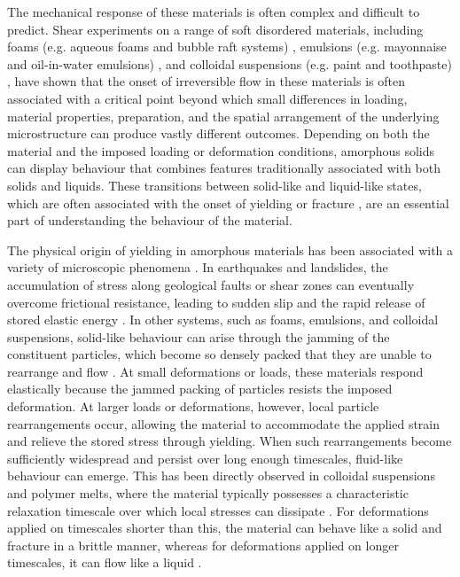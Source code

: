 The mechanical response of these materials is often complex and difficult to predict. Shear experiments on a range of soft disordered materials, including foams (e.g. aqueous foams and bubble raft systems) \cite{durian_foam_1995,Khan1988,WEAIRE2008}, emulsions (e.g. mayonnaise and oil-in-water emulsions) \cite{Mason1996,Datta2011,Derkach2009,AbuJdayil2003}, and colloidal suspensions (e.g. paint and toothpaste) \cite{Mewis2011,Koumakis2011,Petekidis2004,Cloitre2003}, have shown that the onset of irreversible flow in these materials is often associated with a critical point \cite{nicolas_deformation_2018,Divoux2024,lin_scaling_2014,Ozawa2018,Dahmen2011} beyond which small differences in loading, material properties, preparation, and the spatial arrangement of the underlying microstructure can produce vastly different outcomes. Depending on both the material and the imposed loading or deformation conditions, amorphous solids can display behaviour that combines features traditionally associated with both solids and liquids. These transitions between solid-like and liquid-like states, which are often associated with the onset of yielding or fracture \cite{nicolas_deformation_2018,Divoux2024,lin_scaling_2014,Ozawa2018,Dahmen2011}, are an essential part of understanding the behaviour of the material.

The physical origin of yielding in amorphous materials has been associated with a variety of microscopic phenomena \cite{bonn_yield_2017}. In earthquakes and landslides, the accumulation of stress along geological faults or shear zones can eventually overcome frictional resistance, leading to sudden slip and the rapid release of stored elastic energy \cite{Cocco2023}. In other systems, such as foams, emulsions, and colloidal suspensions, solid-like behaviour can arise through the jamming of the constituent particles, which become so densely packed that they are unable to rearrange and flow \cite{Mason1996,Datta2011,Derkach2009,AbuJdayil2003,Mewis2011,Koumakis2011,Petekidis2004,Cloitre2003,Torquato2010,Paredes2013,durian_foam_1995,WEAIRE2008}. At small deformations or loads, these materials respond elastically because the jammed packing of particles resists the imposed deformation. At larger loads or deformations, however, local particle rearrangements occur, allowing the material to accommodate the applied strain and relieve the stored stress through yielding. When such rearrangements become sufficiently widespread and persist over long enough timescales, fluid-like behaviour can emerge. This has been directly observed in colloidal suspensions and polymer melts, where the material typically possesses a characteristic relaxation timescale over which local stresses can dissipate \cite{Koumakis2011,Petekidis2004,Nordstrom2010}. For deformations applied on timescales shorter than this, the material can behave like a solid and fracture in a brittle manner, whereas for deformations applied on longer timescales, it can flow like a liquid \cite{nicolas_deformation_2018,bonn_yield_2017}.

